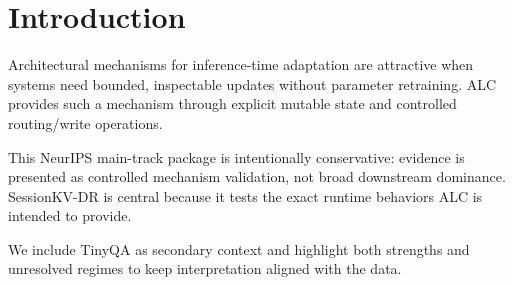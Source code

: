 \section{Introduction}
Architectural mechanisms for inference-time adaptation are attractive when systems need bounded, inspectable updates without parameter retraining. ALC provides such a mechanism through explicit mutable state and controlled routing/write operations.

This NeurIPS main-track package is intentionally conservative: evidence is presented as controlled mechanism validation, not broad downstream dominance. SessionKV-DR is central because it tests the exact runtime behaviors ALC is intended to provide.

We include TinyQA as secondary context and highlight both strengths and unresolved regimes to keep interpretation aligned with the data.
